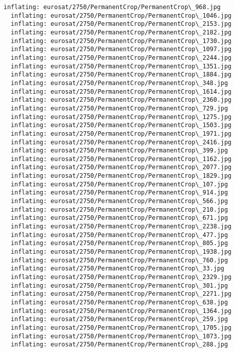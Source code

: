 \documentclass[11pt]{article}
\begin{document}
\begin{Verbatim}[commandchars=\\\{\}]
  inflating: eurosat/2750/PermanentCrop/PermanentCrop\_968.jpg
  inflating: eurosat/2750/PermanentCrop/PermanentCrop\_1046.jpg
  inflating: eurosat/2750/PermanentCrop/PermanentCrop\_2153.jpg
  inflating: eurosat/2750/PermanentCrop/PermanentCrop\_2182.jpg
  inflating: eurosat/2750/PermanentCrop/PermanentCrop\_1730.jpg
  inflating: eurosat/2750/PermanentCrop/PermanentCrop\_1097.jpg
  inflating: eurosat/2750/PermanentCrop/PermanentCrop\_2244.jpg
  inflating: eurosat/2750/PermanentCrop/PermanentCrop\_1351.jpg
  inflating: eurosat/2750/PermanentCrop/PermanentCrop\_1884.jpg
  inflating: eurosat/2750/PermanentCrop/PermanentCrop\_348.jpg
  inflating: eurosat/2750/PermanentCrop/PermanentCrop\_1614.jpg
  inflating: eurosat/2750/PermanentCrop/PermanentCrop\_2360.jpg
  inflating: eurosat/2750/PermanentCrop/PermanentCrop\_729.jpg
  inflating: eurosat/2750/PermanentCrop/PermanentCrop\_1275.jpg
  inflating: eurosat/2750/PermanentCrop/PermanentCrop\_1503.jpg
  inflating: eurosat/2750/PermanentCrop/PermanentCrop\_1971.jpg
  inflating: eurosat/2750/PermanentCrop/PermanentCrop\_2416.jpg
  inflating: eurosat/2750/PermanentCrop/PermanentCrop\_399.jpg
  inflating: eurosat/2750/PermanentCrop/PermanentCrop\_1162.jpg
  inflating: eurosat/2750/PermanentCrop/PermanentCrop\_2077.jpg
  inflating: eurosat/2750/PermanentCrop/PermanentCrop\_1829.jpg
  inflating: eurosat/2750/PermanentCrop/PermanentCrop\_107.jpg
  inflating: eurosat/2750/PermanentCrop/PermanentCrop\_914.jpg
  inflating: eurosat/2750/PermanentCrop/PermanentCrop\_566.jpg
  inflating: eurosat/2750/PermanentCrop/PermanentCrop\_210.jpg
  inflating: eurosat/2750/PermanentCrop/PermanentCrop\_671.jpg
  inflating: eurosat/2750/PermanentCrop/PermanentCrop\_2238.jpg
  inflating: eurosat/2750/PermanentCrop/PermanentCrop\_477.jpg
  inflating: eurosat/2750/PermanentCrop/PermanentCrop\_805.jpg
  inflating: eurosat/2750/PermanentCrop/PermanentCrop\_1938.jpg
  inflating: eurosat/2750/PermanentCrop/PermanentCrop\_760.jpg
  inflating: eurosat/2750/PermanentCrop/PermanentCrop\_33.jpg
  inflating: eurosat/2750/PermanentCrop/PermanentCrop\_2329.jpg
  inflating: eurosat/2750/PermanentCrop/PermanentCrop\_301.jpg
  inflating: eurosat/2750/PermanentCrop/PermanentCrop\_2271.jpg
  inflating: eurosat/2750/PermanentCrop/PermanentCrop\_638.jpg
  inflating: eurosat/2750/PermanentCrop/PermanentCrop\_1364.jpg
  inflating: eurosat/2750/PermanentCrop/PermanentCrop\_259.jpg
  inflating: eurosat/2750/PermanentCrop/PermanentCrop\_1705.jpg
  inflating: eurosat/2750/PermanentCrop/PermanentCrop\_1073.jpg
  inflating: eurosat/2750/PermanentCrop/PermanentCrop\_288.jpg

\end{Verbatim}
\end{document}
